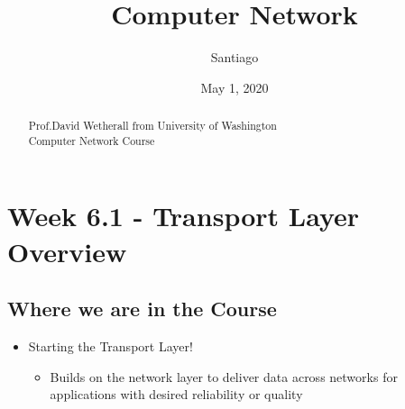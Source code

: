 \documentclass[12pt]{ctexart}   %
\title{ Computer Network }
\author{Santiago}
\date{May 1, 2020}
\begin{document}
\maketitle %

\begin{abstract}
	Prof.David Wetherall from University of Washington \\
	Computer Network Course 
\end{abstract}

\section{Week 6.1 - Transport Layer Overview}
	\subsection{Where we are in the Course}
	\begin{itemize}
		\item Starting the Transport Layer!
		\begin{itemize}
			\item Builds on the network layer to deliver data across networks for applications with desired reliability or quality
		\end{itemize}
	\end{itemize}
	
\end{document}
